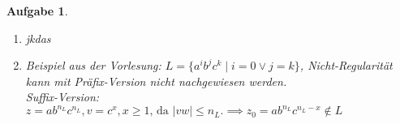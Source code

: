 \documentclass[11pt]{article}
\theoremstyle{break}
\newtheorem{task}{Aufgabe}
\newcommand{\set}[1]{\ensuremath{\{#1\}}}
\newcommand{\abs}[1]{\ensuremath{\left\vert #1 \right\vert}}
\begin{document}
\begin{task}
    \hfill\vspace{-5mm}
    \begin{enumerate}[label={(\alph*)}]
        \item jkdas
        \item Beispiel aus der Vorlesung: $L = \set{a^i b^j c^k\mid i=0 \lor j=k}$, Nicht-Regularität kann mit Präfix-Version nicht nachgewiesen werden.\\
        Suffix-Version: $z = ab^{n_L}c^{n_L}, v = c^x, x\geq 1\text{, da } \abs{vw}\leq n_L.\implies z_0 = ab^{n_L}c^{n_L - x}\notin L$        
    \end{enumerate}
\end{task}
\end{document}
